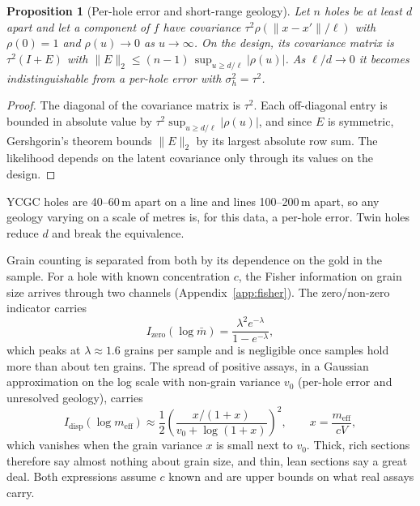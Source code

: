 \documentclass[11pt,a4paper]{article}
\newtheorem{proposition}{Proposition}
\theoremstyle{remark}
\newcommand{\meff}{m_{\mathrm{eff}}}
\newcommand{\mbar}{\bar m}
\begin{document}
\begin{proposition}[Per-hole error and short-range geology]\label{prop:confound}
Let $n$ holes be at least $d$ apart and let a component of $f$ have covariance $\tau^2\rho(\|x - x'\|/\ell)$ with $\rho(0) = 1$ and $\rho(u) \to 0$ as $u \to \infty$. On the design, its covariance matrix is $\tau^2(I + E)$ with $\|E\|_2 \le (n - 1)\,\sup_{u \ge d/\ell} |\rho(u)|$. As $\ell/d \to 0$ it becomes indistinguishable from a per-hole error with $\sigma_h^2 = \tau^2$.
\end{proposition}

\begin{proof}
The diagonal of the covariance matrix is $\tau^2$. Each off-diagonal entry is bounded in absolute value by $\tau^2 \sup_{u \ge d/\ell}|\rho(u)|$, and since $E$ is symmetric, Gershgorin's theorem bounds $\|E\|_2$ by its largest absolute row sum. The likelihood depends on the latent covariance only through its values on the design.
\end{proof}

YCGC holes are 40--60\,m apart on a line and lines 100--200\,m apart, so any geology varying on a scale of metres is, for this data, a per-hole error. Twin holes reduce $d$ and break the equivalence.

Grain counting is separated from both by its dependence on the gold in the sample. For a hole with known concentration $c$, the Fisher information on grain size arrives through two channels (Appendix~\ref{app:fisher}). The zero/non-zero indicator carries
\begin{equation}\label{eq:izero}
I_{\mathrm{zero}}(\log\mbar) = \frac{\lambda^2 e^{-\lambda}}{1 - e^{-\lambda}},
\end{equation}
which peaks at $\lambda \approx 1.6$ grains per sample and is negligible once samples hold more than about ten grains. The spread of positive assays, in a Gaussian approximation on the log scale with non-grain variance $v_0$ (per-hole error and unresolved geology), carries
\begin{equation}\label{eq:idisp}
I_{\mathrm{disp}}(\log\meff) \approx \frac{1}{2}\left(\frac{x/(1+x)}{v_0 + \log(1 + x)}\right)^2,\qquad x = \frac{\meff}{cV},
\end{equation}
which vanishes when the grain variance $x$ is small next to $v_0$. Thick, rich sections therefore say almost nothing about grain size, and thin, lean sections say a great deal. Both expressions assume $c$ known and are upper bounds on what real assays carry.
\end{document}
